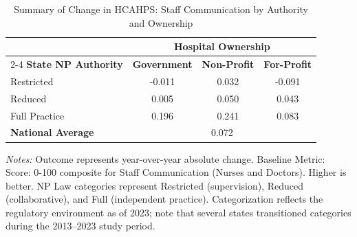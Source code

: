 \begin{table}[htbp]
    \centering
    \caption{Summary of Change in HCAHPS: Staff Communication by Authority and Ownership}
    \label{tab:d_hcahps_grp1}
    \vspace{0.2cm}
    \begin{tabular}{lccc}
        \toprule
        & \multicolumn{3}{c}{\textbf{Hospital Ownership}} \\
        \cmidrule(lr){2-4}
        \textbf{State NP Authority} & \textbf{Government} & \textbf{Non-Profit} & \textbf{For-Profit} \\
        \midrule
        Restricted & -0.011 & 0.032 & -0.091 \\
        Reduced & 0.005 & 0.050 & 0.043 \\
        Full Practice & 0.196 & 0.241 & 0.083 \\
        \midrule
        \textbf{National Average} & \multicolumn{3}{c}{0.072} \\
        \bottomrule
    \end{tabular}
    \vspace{0.1cm}
    \begin{minipage}{0.85\textwidth}
        \footnotesize \textit{Notes:} Outcome represents year-over-year absolute change. Baseline Metric: Score: 0-100 composite for Staff Communication (Nurses and Doctors). Higher is better. NP Law categories represent Restricted (supervision), Reduced (collaborative), and Full (independent practice). Categorization reflects the regulatory environment as of 2023; note that several states transitioned categories during the 2013--2023 study period.
    \end{minipage}
\end{table}